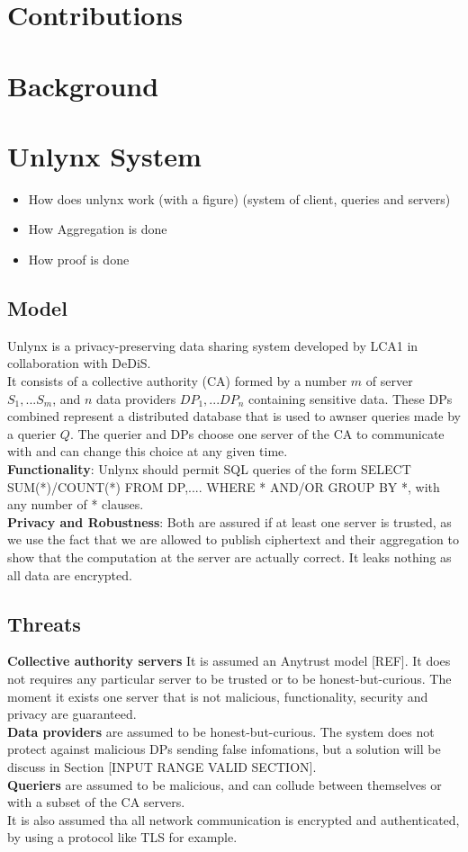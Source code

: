\documentclass{article}
\begin{document}
\section*{Contributions}
\section*{Background}

\section{Unlynx System}
\begin{itemize}
\item How does unlynx work (with a figure) (system of client, queries and servers)
\item How Aggregation is done
\item How proof is done
\end{itemize}
\subsection{Model}
Unlynx is a privacy-preserving data sharing system developed by LCA1 in collaboration with DeDiS.\\
It consists of a collective authority (CA) formed by a number $m$ of server $S_1,...S_m$, and $n$ data providers $DP_1,...DP_n$ containing sensitive data. These DPs combined represent a distributed database that is used to awnser queries made by a querier $Q$. The querier and DPs choose one server of the CA to communicate with and can change this choice at any given time.\\
\textbf{Functionality}: Unlynx should permit SQL queries of the form SELECT SUM(*)/COUNT(*) FROM DP,.... WHERE * AND/OR GROUP BY *, with any number of * clauses.\\
\textbf{Privacy and Robustness}: Both are assured if at least one server is trusted, as we use the fact that we are allowed to publish ciphertext and their aggregation to show that the computation at the server are actually correct. It leaks nothing as all data are encrypted.

\subsection{Threats}
\textbf{Collective authority servers} It is assumed an Anytrust model [REF]. It does not requires any particular server to be trusted or to be honest-but-curious. The moment it exists one server that is not malicious, functionality, security and privacy are guaranteed.\\
\textbf{Data providers} are assumed to be honest-but-curious. The system does not protect against malicious DPs sending false infomations, but a solution will be discuss  in Section [INPUT RANGE VALID SECTION].\\
\textbf{Queriers} are assumed to be malicious, and can collude between themselves or with a subset of the CA servers.\\
It is also assumed tha all network communication is encrypted and authenticated, by using a protocol like TLS for example.
\end{document}
